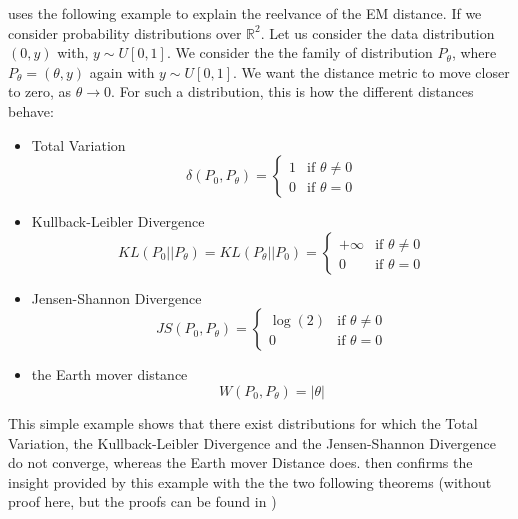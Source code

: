 \documentclass{article}
\begin{document}
\cite{arjovsky2017wasserstein} uses the following example to explain the reelvance of the EM distance. If we consider probability distributions over $\mathbb{R}^2$. Let us consider the data distribution $(0, y)$ with, $y \sim U[0,1]$. We consider the the family of distribution $P_{\theta}$, where $P_{\theta} = (\theta, y)$ again with $y \sim U[0,1]$. We want the distance metric to move closer to zero, as $\theta \rightarrow 0$. For such a distribution, this is how the different distances behave:

\begin{itemize}
    \item Total Variation
    \begin{equation}
        \delta(P_0, P_{\theta}) = 
        \begin{cases}
            1 & \text{if } \theta \neq 0\\
            0 & \text{if } \theta = 0
        \end{cases}
    \end{equation}
    \item Kullback-Leibler Divergence
    \begin{equation}
        KL(P_0 || P_{\theta}) = KL(P_{\theta} || P_0) =
        \begin{cases}
            +\infty & \text{if } \theta \neq 0\\
            0 & \text{if } \theta = 0
        \end{cases}
    \end{equation}
    \item Jensen-Shannon Divergence  
    \begin{equation}
        JS(P_0, P_{\theta}) = 
        \begin{cases}
            \log(2) & \text{if } \theta \neq 0\\
            0 & \text{if } \theta = 0
        \end{cases}
    \end{equation}
    \item the Earth mover distance
    \begin{equation}
        W(P_0, P_{\theta}) = |\theta|
    \end{equation}
\end{itemize}

This simple example shows that there exist distributions for which the Total Variation, the Kullback-Leibler Divergence and the Jensen-Shannon Divergence do not converge, whereas the Earth mover Distance does. \cite{arjovsky2017wasserstein} then confirms the insight provided by this example with the the two following theorems (without proof here, but the proofs can be found in \cite{arjovsky2017wasserstein})
\end{document}
